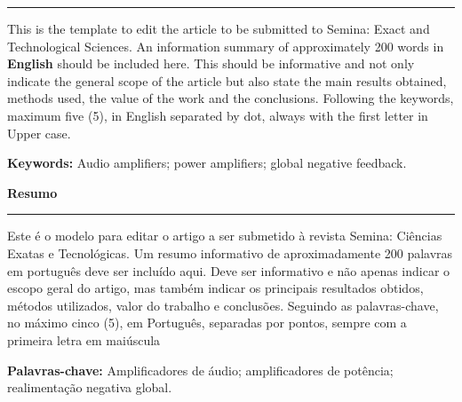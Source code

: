 \documentclass[article,10pt,twoside,a4paper,twocolumn,hidelinks,english,brazil]{abntex2}
\makeatletter
\renewenvironment{abstract}{%
  \if@twocolumn
    \else
    \small
    \begin{center}%
      {\bfseries \large \abstractname\vspace{-.5em}\vspace{\z@}}%
    \end{center}%
    \quotation
  \fi}
{\if@twocolumn\else\endquotation\fi}
\makeatother
\begin{document}
\captionsetup{format=plain,justification=justified,singlelinecheck=false} 

\frenchspacing

\pretextual
\SingleSpacing
\onecolumn

\maketitle
\vspace{-1.2cm}

\thispagestyle{firstpage}

\begin{abstract}
\vspace{-0.3cm}
\hspace{-0.5cm}\rule{0.91\textwidth}{0.5pt}
\normalsize
	This is the template to edit the article to be submitted to Semina: Exact and Technological Sciences. An information summary of approximately 200 words in \textbf{English} should be included here. This should be informative and not only indicate the general scope of the article but also state the main results obtained, methods used, the value of the work and the conclusions.
Following the keywords, maximum five (5), in English separated by dot, always with the first letter in Upper case.
	
\vspace{0.15cm} \noindent \textbf{Keywords:} Audio amplifiers; power amplifiers; global negative feedback. 	 
	
\end{abstract}
\vspace{0.3cm}

\renewcommand{\abstractname}{Resumo}
\begin{abstract}
\vspace{-0.3cm}
\hspace{-0.5cm}\rule{0.91\textwidth}{0.5pt}
    \normalsize
	Este é o modelo para editar o artigo a ser submetido à revista Semina: Ciências Exatas e Tecnológicas. Um resumo informativo de aproximadamente 200 palavras em português deve ser incluído aqui. Deve ser informativo e não apenas indicar o escopo geral do artigo, mas também indicar os principais resultados obtidos, métodos utilizados, valor do trabalho e conclusões. Seguindo as palavras-chave, no máximo cinco (5), em Português, separadas por pontos, sempre com a primeira letra em maiúscula

\vspace{0.15cm} \noindent \textbf{Palavras-chave:} Amplificadores de áudio; amplificadores de potência; realimentação negativa global.
     
\end{abstract}
\vspace{0.3cm}
\end{document}
